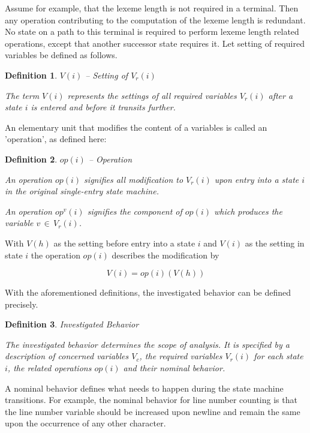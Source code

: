 \documentclass[12pt,a4paper]{scrartcl}
\newtheorem{definition}{Definition}
\begin{document}
Assume for example, that the lexeme length is not required in a terminal. Then
any operation contributing to the computation of the lexeme length is
redundant.  No state on a path to this terminal is required to perform lexeme
length related operations, except that another successor state requires it.
Let setting of required variables be defined as follows.

\begin{definition}
$V(i)$ -- Setting of $V_r(i)$

The term $V(i)$ represents the settings of all required variables $V_r(i)$
after a state $i$ is entered and before it transits further. 
\end{definition}
    
An elementary unit that modifies the content of a variables is called an
'operation', as defined here:

\begin{definition}
$op(i)$ -- Operation 

An operation $op(i)$ signifies all modification to $V_r(i)$ upon entry into a
state $i$ in the original single-entry state machine.

An operation $op^v(i)$ signifies the component of $op(i)$ which produces 
the variable $v\,\in\,V_r(i)$.
\end{definition}
    
With $V(h)$ as the setting before entry into a state $i$ and $V(i)$ as the
setting in state $i$ the operation $op(i)$ describes the modification by 

\begin{equation}
\label{eq:operation}
                         V(i) = op(i)(V(h))
\end{equation}

With the aforementioned definitions, the investigated behavior can be defined
precisely.

\begin{definition}
Investigated Behavior 

The investigated behavior determines the scope of analysis. It is
specified by a description of concerned variables $V_c$, the required
variables $V_r(i)$ for each state $i$, the related operations $op(i)$ and
their nominal behavior.
\end{definition}
    
A nominal behavior defines what needs to happen during the state machine
transitions.  For example, the nominal behavior for line number counting is
that the line number variable should be increased upon newline and remain the
same upon the occurrence of any other character. 
\end{document}
